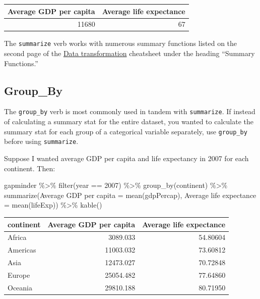 \documentclass[
]{book}
\makeatletter
\newenvironment{Shaded}{\begin{snugshade}}{\end{snugshade}}
\newcommand{\DecValTok}[1]{\textcolor[rgb]{0.06,0.06,0.06}{#1}}
\newcommand{\FunctionTok}[1]{\textcolor[rgb]{0,0,0}{#1}}
\newcommand{\NormalTok}[1]{#1}
\newcommand{\OtherTok}[1]{\textcolor[rgb]{0.37,0.37,0.37}{#1}}
\newcommand{\SpecialCharTok}[1]{\textcolor[rgb]{0,0,0}{#1}}
\newcommand{\StringTok}[1]{\textcolor[rgb]{0.5,0.5,0.5}{#1}}
\newenvironment{kframe}{%
\medskip{}
\setlength{\fboxsep}{.8em}
 \def\at@end@of@kframe{}%
 \ifinner\ifhmode%
  \def\at@end@of@kframe{\end{minipage}}%
  \begin{minipage}{\columnwidth}%
 \fi\fi%
 \def\FrameCommand##1{\hskip\@totalleftmargin \hskip-\fboxsep
 \colorbox{shadecolor}{##1}\hskip-\fboxsep
     \hskip-\linewidth \hskip-\@totalleftmargin \hskip\columnwidth}%
 \MakeFramed {\advance\hsize-\width
   \@totalleftmargin\z@ \linewidth\hsize
   \@setminipage}}%
 {\par\unskip\endMakeFramed%
 \at@end@of@kframe}
\renewenvironment{Shaded}{\begin{kframe}}{\end{kframe}}
\makeatother
\begin{document}
\begin{tabular}{r|r}
\hline
Average GDP per capita & Average life expectance\\
\hline
11680 & 67\\
\hline
\end{tabular}

The \texttt{summarize} verb works with numerous summary functions listed on the second page of the \href{https://github.com/rstudio/cheatsheets/raw/master/data-transformation.pdf}{Data transformation} cheatsheet under the heading ``Summary Functions.''

\hypertarget{group_by}{%
\subsection{Group\_By}\label{group_by}}

The \texttt{group\_by} verb is most commonly used in tandem with \texttt{summarize}. If instead of calculating a summary stat for the entire dataset, you wanted to calculate the summary stat for each group of a categorical variable separately, use \texttt{group\_by} before using \texttt{summarize}.

Suppose I wanted average GDP per capita and life expectancy in 2007 for each continent. Then:

\begin{Shaded}
\begin{Highlighting}[]
\NormalTok{gapminder }\SpecialCharTok{\%\textgreater{}\%} 
  \FunctionTok{filter}\NormalTok{(year }\SpecialCharTok{==} \DecValTok{2007}\NormalTok{) }\SpecialCharTok{\%\textgreater{}\%} 
  \FunctionTok{group\_by}\NormalTok{(continent) }\SpecialCharTok{\%\textgreater{}\%} 
  \FunctionTok{summarize}\NormalTok{(}\StringTok{\textquotesingle{}Average GDP per capita\textquotesingle{}} \OtherTok{=} \FunctionTok{mean}\NormalTok{(gdpPercap), }
            \StringTok{\textquotesingle{}Average life expectance\textquotesingle{}} \OtherTok{=} \FunctionTok{mean}\NormalTok{(lifeExp)) }\SpecialCharTok{\%\textgreater{}\%} 
  \FunctionTok{kable}\NormalTok{()}
\end{Highlighting}
\end{Shaded}

\begin{tabular}{l|r|r}
\hline
continent & Average GDP per capita & Average life expectance\\
\hline
Africa & 3089.033 & 54.80604\\
\hline
Americas & 11003.032 & 73.60812\\
\hline
Asia & 12473.027 & 70.72848\\
\hline
Europe & 25054.482 & 77.64860\\
\hline
Oceania & 29810.188 & 80.71950\\
\hline
\end{tabular}
\end{document}
